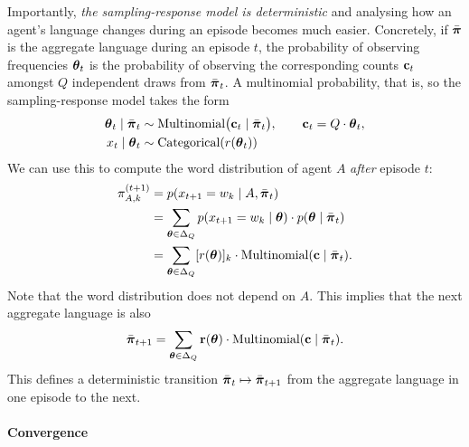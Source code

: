 \documentclass{../src/bcthesispart}
\begin{document}
Importantly, \emph{the sampling-response model is deterministic} and analysing how an agent’s language changes during an episode becomes much easier.
Concretely, if $\bar{\boldsymbol{\mathbf{\pi}}}$ is the aggregate language during an episode $t$, the probability of observing frequencies $\boldsymbol{\mathbf{\theta}}_t$ is the probability of observing the corresponding counts $\boldsymbol{\mathbf{c}}_t$ amongst $Q$ independent draws from $\bar{\boldsymbol{\mathbf{\pi}}}_t$.
A multinomial probability, that is, so the sampling-response model takes the form
\begin{align}
	\boldsymbol{\mathbf{\theta}}_t \mid \bar{\boldsymbol{\mathbf{\pi}}}_t
		& \sim \text{Multinomial} \bigl(\boldsymbol{\mathbf{c}}_t \mid \bar{\boldsymbol{\mathbf{\pi}}}_t \bigr),
		\qquad \boldsymbol{\mathbf{c}}_t = Q\cdot \boldsymbol{\mathbf{\theta}}_t, 
	\\
	x_t \mid \boldsymbol{\mathbf{\theta}}_t
		& \sim \text{Categorical}( r(\boldsymbol{\mathbf{\theta}}_t) )
\end{align}
We can use this to compute the word distribution of agent $A$ \emph{after} episode $t$:
\begin{align}
	\pi_{A,k}^{(t+1)}
		&= p(x_{t+1} 
		= w_k \mid A, \bar{\boldsymbol{\mathbf{\pi}}}_t)
		\\
		&= \sum_{\boldsymbol{\mathbf{\theta}} \in \Delta_Q} p(x_{t+1} = w_k \mid \boldsymbol{\mathbf{\theta}}) \cdot p(\boldsymbol{\mathbf{\theta}} \mid \bar{\boldsymbol{\mathbf{\pi}}}_t) 
		\\
		&= \sum_{\boldsymbol{\mathbf{\theta}} \in \Delta_Q} 
			[r(\boldsymbol{\mathbf{\theta}})]_k 
			\cdot 
			\text{Multinomial}( \boldsymbol{\mathbf{c}} \mid \bar{\boldsymbol{\mathbf{\pi}}}_t).
\end{align}
Note that the word distribution does not depend on $A$.
This implies that the next aggregate language is also
\begin{equation}
	\label{eq:ch3:sampling-response-transition}
	\bar{\boldsymbol{\mathbf{\pi}}}_{t+1} 
		= \sum_{\boldsymbol{\mathbf{\theta}} \in \Delta_Q}	 \boldsymbol{\mathbf{r}}(\boldsymbol{\mathbf{\theta}}) \cdot \text{Multinomial}( \boldsymbol{\mathbf{c}} \mid \bar{\boldsymbol{\mathbf{\pi}}}_t).
\end{equation}
This defines a deterministic transition $\bar{\boldsymbol{\mathbf{\pi}}}_t \mapsto \bar{\boldsymbol{\mathbf{\pi}}}_{t+1}$ from the aggregate language in one episode to the next.




\paragraph{Convergence}
\end{document}
